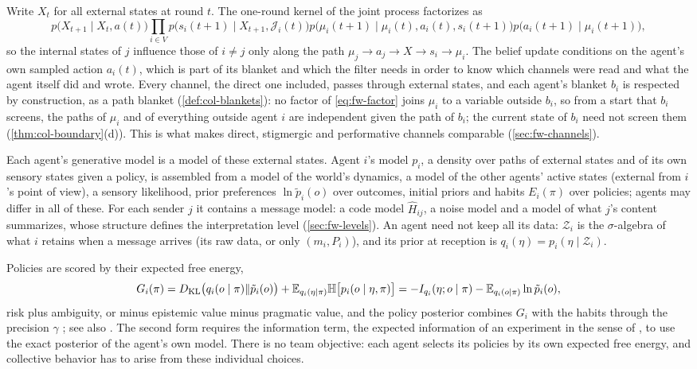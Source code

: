 Write $X_t$ for all external states at round $t$. The one-round kernel of the joint process factorizes as
\begin{equation}\label{eq:fw-factor}
p\bigl(X_{t+1}\mid X_t,a(t)\bigr)\prod_{i\in V}p\bigl(s_i(t+1)\mid X_{t+1},\mathcal J_i(t)\bigr)p\bigl(\mu_i(t+1)\mid\mu_i(t),a_i(t),s_i(t+1)\bigr)p\bigl(a_i(t+1)\mid\mu_i(t+1)\bigr),
\end{equation}
so the internal states of $j$ influence those of $i\ne j$ only along the path $\mu_j\to a_j\to X\to s_i\to\mu_i$. The belief update conditions on the agent's own sampled action $a_i(t)$, which is part of its blanket and which the filter needs in order to know which channels were read and what the agent itself did and wrote. Every channel, the direct one included, passes through external states, and each agent's blanket $b_i$ is respected by construction, as a path blanket (\cref{def:col-blankets}): no factor of \eqref{eq:fw-factor} joins $\mu_i$ to a variable outside $b_i$, so from a start that $b_i$ screens, the paths of $\mu_i$ and of everything outside agent $i$ are independent given the path of $b_i$; the current state of $b_i$ need not screen them (\cref{thm:col-boundary}(d)). This is what makes direct, stigmergic and performative channels comparable (\cref{sec:fw-channels}).

Each agent's generative model is a model of these external states. Agent $i$'s model $p_i$, a density over paths of external states and of its own sensory states given a policy, is assembled from a model of the world's dynamics, a model of the other agents' active states (external from $i$'s point of view), a sensory likelihood, prior preferences $\ln\tilde p_i(o)$ over outcomes, initial priors and habits $E_i(\pi)$ over policies; agents may differ in all of these. For each sender $j$ it contains a message model: a code model $\hat H_{ij}$, a noise model and a model of what $j$'s content summarizes, whose structure defines the interpretation level (\cref{sec:fw-levels}). An agent need not keep all its data: $\mathcal Z_i$ is the $\sigma$-algebra of what $i$ retains when a message arrives (its raw data, or only $(m_i,P_i)$), and its prior at reception is $q_i(\eta)=p_i(\eta\mid\mathcal Z_i)$.

Policies are scored by their expected free energy,
\begin{equation}\label{eq:fw-efe}
G_i(\pi)=D_{\mathrm{KL}}\bigl(q_i(o\mid\pi)\Vert\tilde p_i(o)\bigr)+\mathbb{E}_{q_i(\eta\mid\pi)}\mathbb H\bigl[p_i(o\mid\eta,\pi)\bigr]=-I_{q_i}(\eta;o\mid\pi)-\mathbb{E}_{q_i(o\mid\pi)}\ln\tilde p_i(o),
\end{equation}
risk plus ambiguity, or minus epistemic value minus pragmatic value, and the policy posterior combines $G_i$ with the habits through the precision $\gamma$ \citep[Sections~6 and~7]{dacosta2020active}; see also \citet{friston2017active,parr2022active}. The second form requires the information term, the expected information of an experiment in the sense of \citet{lindley1956measure}, to use the exact posterior of the agent's own model. There is no team objective: each agent selects its policies by its own expected free energy, and collective behavior has to arise from these individual choices.

